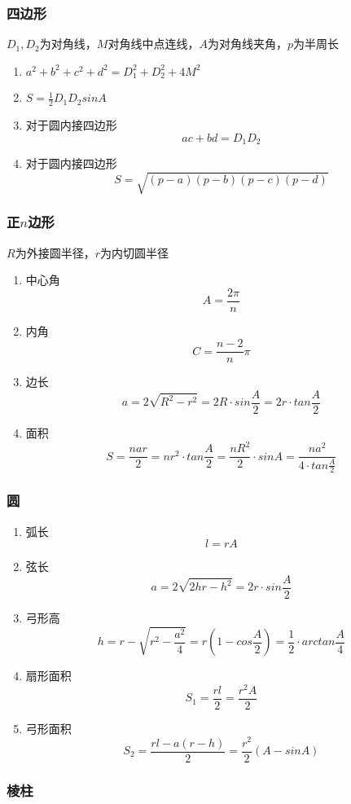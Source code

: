 \documentclass[a4paper]{article}
\begin{document}
\subsubsection{四边形}

$D_1, D_2$为对角线，$M$对角线中点连线，$A$为对角线夹角，$p$为半周长
\begin{enumerate}
	\item $a^2+b^2+c^2+d^2=D_1^2+D_2^2+4M^2$
	\item $S=\frac{1}{2}D_1D_2sinA$
	\item 对于圆内接四边形
		$$ac+bd=D_1D_2$$
	\item 对于圆内接四边形
		$$S=\sqrt{(p-a)(p-b)(p-c)(p-d)}$$
\end{enumerate}

\subsubsection{正$n$边形}

$R$为外接圆半径，$r$为内切圆半径
\begin{enumerate}
	\item 中心角
		$$A=\frac{2\pi}{n}$$
	\item 内角
		$$C=\frac{n-2}{n}\pi$$
	\item 边长
		$$a=2\sqrt{R^2-r^2}=2R \cdot sin\frac{A}{2}=2r \cdot tan\frac{A}{2}$$
	\item 面积
		$$S=\frac{nar}{2}=nr^2 \cdot tan\frac{A}{2}=\frac{nR^2}{2} \cdot sinA=\frac{na^2}{4 \cdot tan\frac{A}{2}}$$
\end{enumerate}

\subsubsection{圆}

\begin{enumerate}
	\item 弧长
		$$l=rA$$
	\item 弦长
		$$a=2\sqrt{2hr-h^2}=2r\cdot sin\frac{A}{2}$$
	\item 弓形高
		$$h=r-\sqrt{r^2-\frac{a^2}{4}}=r(1-cos\frac{A}{2})=\frac{1}{2} \cdot arctan\frac{A}{4}$$
	\item 扇形面积
		$$S_1=\frac{rl}{2}=\frac{r^2A}{2}$$
	\item 弓形面积
		$$S_2=\frac{rl-a(r-h)}{2}=\frac{r^2}{2}(A-sinA)$$
\end{enumerate}

\subsubsection{棱柱}
\end{document}
